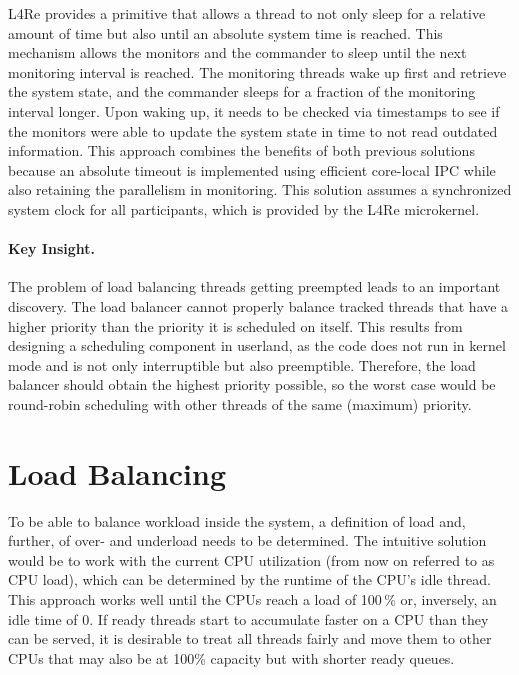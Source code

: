 L4Re provides a primitive that allows a thread to not only sleep for a relative amount of time but also until an absolute system time is reached.
This mechanism allows the monitors and the commander to sleep until the next monitoring interval is reached.
The monitoring threads wake up first and retrieve the system state, and the commander sleeps for a fraction of the monitoring interval longer.
Upon waking up, it needs to be checked via timestamps to see if the monitors were able to update the system state in time to not read outdated information.
This approach combines the benefits of both previous solutions because an absolute timeout is implemented using efficient core-local IPC while also retaining the parallelism in monitoring.
This solution assumes a synchronized system clock for all participants, which is provided by the L4Re microkernel.

\paragraph{Key Insight.}
\label{sec:insight-prio}

The problem of load balancing threads getting preempted leads to an important discovery.
The load balancer cannot properly balance tracked threads that have a higher priority than the priority it is scheduled on itself.
This results from designing a scheduling component in userland, as the code does not run in kernel mode and is not only interruptible but also preemptible.
Therefore, the load balancer should obtain the highest priority possible, so the worst case would be round-robin scheduling with other threads of the same (maximum) priority.

\section{Load Balancing}
\label{sec:des:loba}

To be able to balance workload inside the system, a definition of load and, further, of over- and underload needs to be determined.
The intuitive solution would be to work with the current CPU utilization (from now on referred to as CPU load), which can be determined by the runtime of the CPU's idle thread.
This approach works well until the CPUs reach a load of 100\,\% or, inversely, an idle time of 0.
If ready threads start to accumulate faster on a CPU than they can be served, it is desirable to treat all threads fairly and move them to other CPUs that may also be at 100\% capacity but with shorter ready queues.

